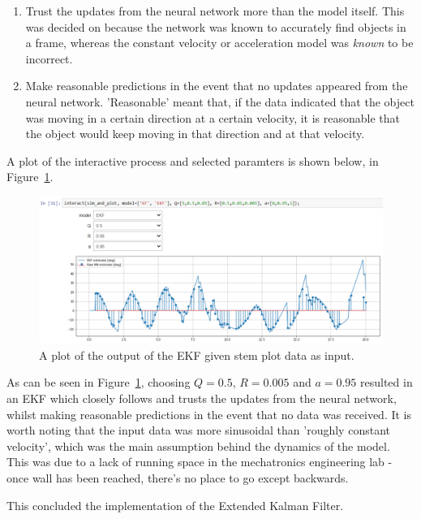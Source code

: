 \begin{enumerate}
\item Trust the updates from the neural network more than the model itself. This was decided on because the network was known to accurately find objects in a frame, whereas the constant velocity or acceleration model was \emph{known} to be incorrect.
\item Make reasonable predictions in the event that no updates appeared from the neural network. 'Reasonable' meant that, if the data indicated that the object was moving in a certain direction at a certain velocity, it is reasonable that the object would keep moving in that direction and at that velocity.
\end{enumerate}

A plot of the interactive process and selected paramters is shown below, in Figure~\ref{fig:tuning_Q_R}.

\begin{figure}[h!]
  \centering
  \includegraphics[width=\textwidth]{methodology/tuning_Q_R}
  \caption{\label{fig:tuning_Q_R} A plot of the output of the EKF given stem plot data as input.}
\end{figure}

As can be seen in Figure~\ref{fig:tuning_Q_R}, choosing $Q = 0.5$, $R = 0.005$ and $a = 0.95$ resulted in an EKF which closely follows and trusts the updates from the neural network, whilst making reasonable predictions in the event that no data was received. It is worth noting that the input data was more sinusoidal than 'roughly constant velocity', which was the main assumption behind the dynamics of the model. This was due to a lack of running space in the mechatronics engineering lab - once wall has been reached, there's no place to go except backwards.

This concluded the implementation of the Extended Kalman Filter.
